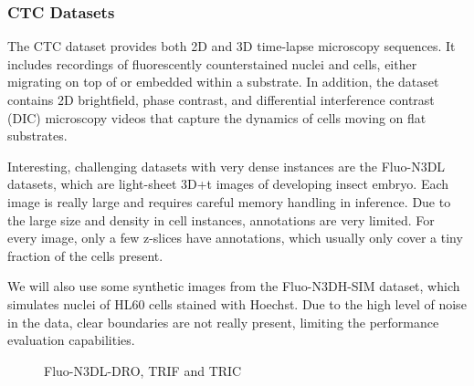 \subsubsection{CTC Datasets}

The CTC dataset provides both 2D and 3D time-lapse microscopy sequences. It includes recordings of fluorescently counterstained nuclei and cells, either migrating on top of or embedded within a substrate. In addition, the dataset contains 2D brightfield, phase contrast, and differential interference contrast (DIC) microscopy videos that capture the dynamics of cells moving on flat substrates. 

Interesting, challenging datasets with very dense instances are the Fluo-N3DL datasets, which are light-sheet 3D+t images of developing insect embryo. Each image is really large and requires careful memory handling in inference. Due to the large size and density in cell instances, annotations are very limited. For every image, only a few z-slices have annotations, which usually only cover a tiny fraction of the cells present.

We will also use some synthetic images from the Fluo-N3DH-SIM dataset, which simulates nuclei of HL60 cells stained with Hoechst. Due to the high level of noise in the data, clear boundaries are not really present, limiting the performance evaluation capabilities. 

\begin{figure}[!ht]
    \centering
    \caption{Fluo-N3DL-DRO, TRIF and TRIC}
    \label{fig:slicing}
\end{figure}


